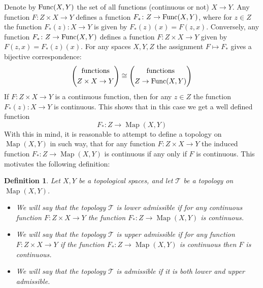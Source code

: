 \documentclass[11pt, letterpaper, oneside]{report}
\theoremstyle{pplain}
\newtheorem{ITERMVALUE THM}[theorem]{Intermediate Value Theorem}
\newtheorem{HEINEBOREL THM}[theorem]{Heine-Borel Theorem}
\newtheorem{UMETR THM}[theorem]{Urysohn Metrization Theorem}
\newtheorem{UMETR2 THM}[theorem]{Urysohn Metrization Theorem (v.2)}
\theoremstyle{ddefinition}
\newtheorem{definition}[theorem]{Definition}
\theoremstyle{nnn}
\newtheorem{TDA NN}[theorem]{Topological Data Analysis. }
\theoremstyle{eexercise}
\newcommand{\Map}{\operatorname{Map}}
\newcommand{\TT}{{\mathcal T}}
\begin{document}
Denote by  ${\rm Func}(X, Y)$ the set of all functions (continuous or not) $X \to Y$. 
Any function $F\colon Z\times X \to Y$  defines a function 
$F_{\ast}\colon Z\to  {\rm Func}(X, Y)$, where for $z\in Z$ the function $F_{\ast}(z)\colon X \to Y$ is given by 
$F_{\ast}(z)(x) = F(z, x)$.  Conversely, any function $F_{\ast}\colon Z\to  {\rm Func}(X, Y)$ defines 
a function $F\colon Z\times X \to Y$ given by $F(z,x) = F_{\ast}(z)(x)$. For any spaces $X, Y, Z$ 
the assignment 
$F \mapsto F_{\ast}$ gives a bijective correspondence:
$$
\begin{pmatrix}
\text{functions} \\[1mm]
\text{$ Z\times X \to Y$} \\
\end{pmatrix}
\cong 
\begin{pmatrix}
\text{functions} \\[1mm]
\text{$Z\to  {\rm Func}(X, Y)$} \\
\end{pmatrix}
$$
If $F\colon Z\times X \to Y$ is a continuous function, then for any $z\in Z$ the function $F_{\ast}(z)\colon X \to Y$
is continuous. This shows that in this case we get a well defined function 
$$F_{\ast}\colon Z \to \Map(X, Y)$$
With this in mind, it is reasonable to attempt to define a topology on $\Map(X, Y)$ in such way, that 
for any function $F\colon Z\times X \to Y$ the induced function $F_{\ast}\colon Z \to \Map(X, Y)$ is continuous 
if any only if $F$ is continuous. This motivates the following definition:
 
\begin{definition} Let $X, Y$ be a topological spaces, and let $\TT$ be a topology on $\Map(X, Y)$. 
\begin{itemize} 
\item[1)] We will say that the topology $\TT$ is \emph{lower admissible} if for any continuous function 
$F\colon Z\times X \to Y$ the function $F_{\ast}\colon Z \to \Map(X, Y)$ is continuous. 
\item[2)] We will say that the topology $\TT$ is \emph{upper admissible} if for any  function 
$F\colon Z\times X \to Y$ if the function $F_{\ast}\colon Z \to \Map(X, Y)$ is continuous then $F$
is continuous.
\item[3)] We will say that the topology $\TT$ is \emph{admissible} if it is both lower and upper admissible. 
\end{itemize}
\end{definition}
\end{document}
